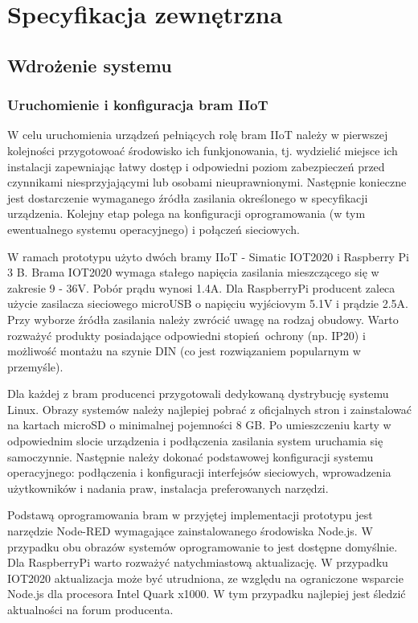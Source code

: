 \documentclass[a4paper, 12pt, twoside]{article}
\begin{document}
\clearpage

\section{Specyfikacja zewnętrzna}\label{spec-zew}

\subsection{Wdrożenie systemu}

\subsubsection{Uruchomienie i konfiguracja bram IIoT}

W celu uruchomienia urządzeń pełniących rolę bram IIoT należy w pierwszej
kolejności przygotowoać środowisko ich funkjonowania, tj. wydzielić
miejsce ich instalacji zapewniając łatwy dostęp i odpowiedni poziom zabezpieczeń
przed czynnikami niesprzyjającymi lub osobami nieuprawnionymi. Następnie 
konieczne jest dostarczenie wymaganego źródła zasilania określonego
w specyfikacji urządzenia. Kolejny etap polega na konfiguracji oprogramowania
(w tym ewentualnego systemu operacyjnego) i połączeń sieciowych. 

W ramach prototypu użyto dwóch bramy IIoT - Simatic IOT2020 i Raspberry Pi 3 B.
Brama IOT2020 wymaga stałego napięcia zasilania mieszczącego się w zakresie 9 - 36V.
Pobór prądu wynosi 1.4A. Dla RaspberryPi producent zaleca użycie
zasilacza sieciowego microUSB o napięciu wyjściovym 5.1V i prądzie 2.5A.
Przy wyborze źródła zasilania należy zwrócić uwagę na rodzaj obudowy. Warto 
rozważyć produkty posiadające odpowiedni stopień ochrony (np. IP20) i możliwość
montażu na szynie DIN (co jest rozwiązaniem popularnym w przemyśle).

Dla każdej z bram producenci przygotowali dedykowaną dystrybucję systemu Linux.
Obrazy systemów należy najlepiej pobrać z oficjalnych stron i zainstalować na kartach
microSD o minimalnej pojemności 8 GB. Po umieszczeniu karty w odpowiednim
slocie urządzenia i podłączenia zasilania system uruchamia się samoczynnie.
Następnie należy dokonać podstawowej konfiguracji systemu operacyjnego: podłączenia i konfiguracji interfejsów sieciowych,
wprowadzenia użytkowników i nadania praw, instalacja preferowanych narzędzi.  

Podstawą oprogramowania bram w przyjętej implementacji prototypu jest 
narzędzie Node-RED wymagające zainstalowanego środowiska Node.js. W przypadku
obu obrazów systemów oprogramowanie to jest dostępne domyślnie. Dla RaspberryPi 
warto rozważyć natychmiastową aktualizację. W przypadku IOT2020 aktualizacja
może być utrudniona, ze względu na ograniczone wsparcie Node.js dla procesora
Intel Quark x1000. W tym przypadku najlepiej jest śledzić aktualności na 
forum producenta.
\end{document}
